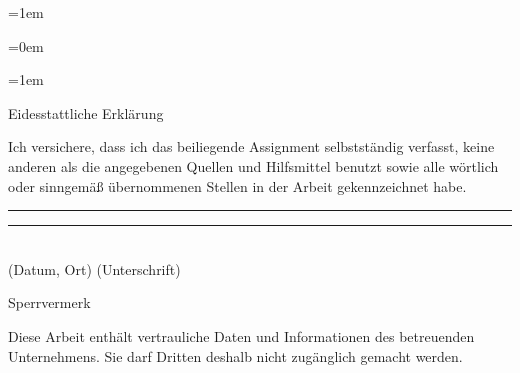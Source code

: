\documentclass[a4paper,12pt]{article}
\newif\iflistoffigures
\newif\iflistoftables
\newif\ifacronym
\newif\ifsperrvermerk
\begin{document}

\parskip=1em
\parindent=0cm



\normalsize

\pagestyle{fancy}
\fancyhead{}
\fancyhead[LO,RE]{\textsc{\Titel}}
\fancyhead[RO,LE]{\thepage}
\fancyfoot[CO,CE]{}
\setlength{\headheight}{15pt}

\begin{spacing}{1.0} %
\parskip=0em
\newpage

\setcounter{tocdepth}{2}
\renewcommand{\contentsname}{Gliederung}
\tableofcontents 
\newpage

\iflistoftables
\listoftables 
\newpage
\fi

\iflistoffigures
\listoffigures 
\newpage
\fi

\ifacronym

\fi

\parskip=1em
\end{spacing} 

\clearpage


\begin{spacing}{1.5} %







\end{spacing}

\clearpage

\renewcommand{\refname}{Literatur-- und Quellenverzeichnis}
%
%



\onehalfspacing
\clearpage


\vspace*{\fill}
\vfill
\vfill
\begin{center}
{\Large Eidesstattliche Erklärung}
\end{center}
\vfill
\noindent
Ich versichere, dass ich das beiliegende Assignment selbstständig verfasst, keine anderen als die angegebenen Quellen und Hilfsmittel benutzt sowie alle wörtlich oder sinngemäß übernommenen Stellen in der Arbeit gekennzeichnet habe. 
\vfill
\vfill
\vfill
\rule[0.5ex]{6.5cm}{1pt}
\hspace{1.3cm}
\rule[0.5ex]{6.5cm}{1pt}
\\(Datum, Ort)
\hspace{6.3cm}
(Unterschrift)
\vfill
\vfill
\vfill
\ifsperrvermerk
\begin{center}
{\Large Sperrvermerk}
\end{center}
\vfill
Diese Arbeit enthält vertrauliche Daten und Informationen des betreuenden
Unternehmens. Sie darf Dritten deshalb nicht zugänglich gemacht werden.
\end{document}
